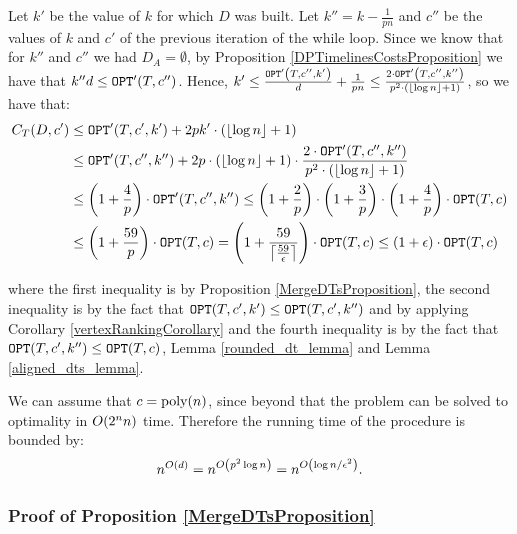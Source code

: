 Let $k'$ be the value of $k$ for which $D$ was built. Let $k''=k-\frac{1}{pn}$ and $c''$ be the values of $k$ and $c'$ of the previous iteration of the while loop. Since we know that for $k''$ and $c''$ we had $D_A=\emptyset$, by Proposition \ref{DPTimelinesCostsProposition} we have that $k'' d \leq \OPT'\br{T,c''}$. Hence,
 $k'\leq \frac{\OPT'\br{T,c'',k'}}{d}+\frac{1}{pn}\leq\frac{2\cdot \OPT'\br{T,c'',k''}}{p^2\cdot\br{\fl{\log n}+1}}$, so we have that:
\begin{align*}
    \COST_{T}\br{D,c'}&\leq \OPT'\br{T,c',k'}+2pk'\cdot \br{\fl{\log n}+1}
    \\&\leq \OPT'\br{T,c'',k''}+2p\cdot \br{\fl{\log n}+1}\cdot \frac{2\cdot\OPT'\br{T,c'', k''}}{p^2\cdot\br{\fl{\log n}+1}} \\
    & \leq \br{1+\frac{4}{p}}\cdot\OPT'\br{T,c'',k''}\leq \br{1+\frac{2}{p}}\cdot\br{1+\frac{3}{p}}\cdot\br{1+\frac{4}{p}}\cdot\OPT\br{T,c}
    \\&
    \leq \br{1+\frac{59}{p}}\cdot\OPT\br{T,c} = \br{1+\frac{59}{\cl{\frac{59}{\epsilon}}}}\cdot\OPT\br{T,c}\leq \br{1+\epsilon}\cdot \OPT\br{T,c}
\end{align*}
    
where the first inequality is by Proposition \ref{MergeDTsProposition}, the second inequality is by the fact that $\OPT\br{T,c',k'}\leq \OPT\br{T,c',k''}$ and by applying Corollary \ref{vertexRankingCorollary} and the fourth inequality is by the fact that $\OPT\br{T,c',k''}\leq \OPT\br{T,c}$, Lemma \ref{rounded_dt_lemma} and Lemma \ref{aligned_dts_lemma}.

We can assume that $c=\text{poly}\br{n}$, since beyond that the problem can be solved to optimality in $O\br{2^nn}$ time. Therefore the running time of the procedure is bounded by:
$$
n^{O\br{d}}=n^{O\br{p^2\log n}}=n^{O\br{\log n/\epsilon^2}}.
$$
\subsubsection{Proof of Proposition \ref{MergeDTsProposition}}


% 

